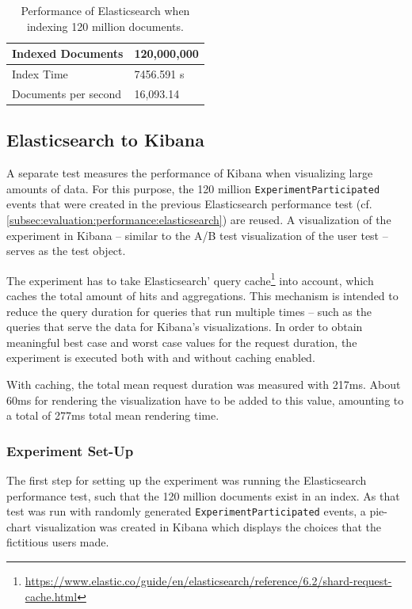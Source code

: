 \begin{table}
\caption{Performance of Elasticsearch when indexing 120 million documents.}
\label{table:elasticsearch-performance}
\centering
\begin{tabular}{l|l}
Indexed Documents & 120,000,000 \\ \hline
Index Time & 7456.591 s \\ \hline
Documents per second & 16,093.14
\end{tabular}
\end{table}

\subsection{Elasticsearch to Kibana}
\label{subsec:evaluation:performance:kibana}

A separate test measures the performance of Kibana when visualizing large amounts of data.
For this purpose, the 120 million \texttt{ExperimentParticipated} events that were created in the previous Elasticsearch performance test (cf. \cref{subsec:evaluation:performance:elasticsearch}) are reused.
A visualization of the experiment in Kibana -- similar to the A/B test visualization of the user test -- serves as the test object.


The experiment has to take Elasticsearch' query cache\footnote{\url{https://www.elastic.co/guide/en/elasticsearch/reference/6.2/shard-request-cache.html}} into account, which caches the total amount of hits and aggregations.
This mechanism is intended to reduce the query duration for queries that run multiple times -- such as the queries that serve the data for Kibana's visualizations.
In order to obtain meaningful best case and worst case values for the request duration, the experiment is executed both with and without caching enabled.

With caching, the total mean request duration was measured with 217ms.
About 60ms for rendering the visualization have to be added to this value, amounting to a total of 277ms total mean rendering time.

\subsubsection{Experiment Set-Up}

The first step for setting up the experiment was running the Elasticsearch performance test, such that the 120 million documents exist in an index.
As that test was run with randomly generated \texttt{ExperimentParticipated} events, a pie-chart visualization was created in Kibana which displays the choices that the fictitious users made.

